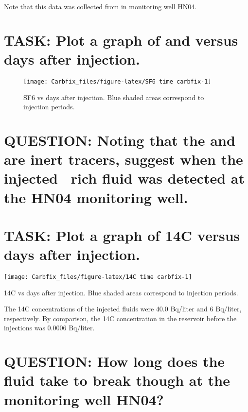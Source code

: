 \documentclass[nofonts,x11names]{tufte-handout}
\begin{document}
\noindent Note that this data was collected from in monitoring well
HN04.

\section{\texorpdfstring{TASK: Plot a graph of  and
versus days after
injection.}{TASK: Plot a graph of  and versus days after injection.}}\label{task-plot-a-graph-of-and-versus-days-after-injection.}

\begin{figure*}
\texttt{[image: Carbfix\_files/figure-latex/SF6 time carbfix-1]} \caption[SF6 vs days after injection]{SF6 vs days after injection.  Blue shaded areas correspond to injection periods.}\label{fig:SF6 time carbfix}
\end{figure*}

\section{\texorpdfstring{QUESTION: Noting that the  and
 are inert tracers, suggest when the injected \carb~rich
fluid was detected at the HN04 monitoring
well.}{QUESTION: Noting that the  and  are inert tracers, suggest when the injected ~rich fluid was detected at the HN04 monitoring well.}}\label{question-noting-that-the-and-are-inert-tracers-suggest-when-the-injected-rich-fluid-was-detected-at-the-hn04-monitoring-well.}

\section{TASK: Plot a graph of 14C versus days after
injection.}\label{task-plot-a-graph-of-14c-versus-days-after-injection.}

\begin{marginfigure}[0.5cm]
\texttt{[image: Carbfix\_files/figure-latex/14C time carbfix-1]} \caption[14C vs days after injection]{14C vs days after injection.  Blue shaded areas correspond to injection periods.}\label{fig:14C time carbfix}
\end{marginfigure}

\noindent The 14C concentrations of the injected fluids were 40.0
Bq/liter and 6 Bq/liter, respectively. By comparison, the 14C
concentration in the reservoir before the injections was 0.0006
Bq/liter.

\section{QUESTION: How long does the fluid take to break though at the
monitoring well
HN04?}\label{question-how-long-does-the-fluid-take-to-break-though-at-the-monitoring-well-hn04}
\end{document}
